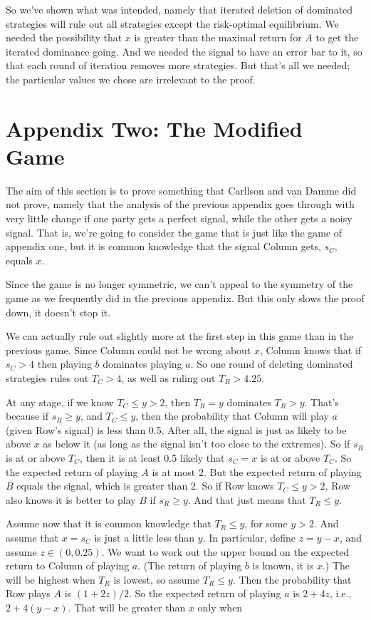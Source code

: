 \documentclass{article}
\begin{document}
So we've shown what was intended, namely that iterated deletion of dominated strategies will rule out all strategies except the risk-optimal equilibrium. We needed the possibility that $x$ is greater than the maximal return for $A$ to get the iterated dominance going. And we needed the signal to have an error bar to it, so that each round of iteration removes more strategies. But that's all we needed; the particular values we chose are irrelevant to the proof.

\section*{Appendix Two: The Modified Game}
\label{appendixtwo:themodifiedgame}

The aim of this section is to prove something that Carllson and van Damme did not prove, namely that the analysis of the previous appendix goes through with very little change if one party gets a perfect signal, while the other gets a noisy signal. That is, we're going to consider the game that is just like the game of appendix one, but it is common knowledge that the signal Column gets, $s_C$, equals $x$. 

Since the game is no longer symmetric, we can't appeal to the symmetry of the game as we frequently did in the previous appendix. But this only slows the proof down, it doesn't stop it.

We can actually rule out slightly more at the first step in this game than in the previous game. Since Column could not be wrong about $x$, Column knows that if $s_C > 4$ then playing $b$ dominates playing $a$. So one round of deleting dominated strategies rules out $T_C > 4$, as well as ruling out $T_R > 4.25$.

At any stage, if we know $T_C \leq y > 2$, then $T_R = y$ dominates $T_R > y$. That's because if $s_R \geq y$, and $T_C \leq y$, then the probability that Column will play $a$ (given Row's signal) is less than 0.5. After all, the signal is just as likely to be above $x$ as below it (as long as the signal isn't too close to the extremes). So if $s_R$ is at or above $T_C$, then it is at least 0.5 likely that $s_C = x$ is at or above $T_C$. So the expected return of playing $A$ is at most 2. But the expected return of playing $B$ equals the signal, which is greater than 2. So if Row knows $T_C \leq y > 2$, Row also knows it is better to play $B$ if $s_R \geq y$. And that just means that $T_R \leq y$.

Assume now that it is common knowledge that $T_R \leq y$, for some $y > 2$. And assume that $x = s_C$ is just a little less than $y$. In particular, define $z = y -x$, and assume $z \in (0, 0.25)$. We want to work out the upper bound on the expected return to Column of playing $a$. (The return of playing $b$ is known, it is $x$.) The will be highest when $T_R$ is lowest, so assume $T_R \leq y$. Then the probability that Row plays $A$ is $(1 + 2z)/2$. So the expected return of playing $a$ is $2 + 4z$, i.e., $2 + 4(y - x)$. That will be greater than $x$ only when 
\end{document}
